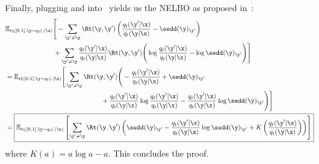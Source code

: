 \documentclass{article} %
\begin{document}
{\begin{appendices}
Finally, plugging  and  into~ yields us the NELBO as proposed in~\citet{lou2023discrete}:
\begin{align}\label{eqn:sedd_elbo}
    & \mathbb{E}_{t \in [0, 1], \y \sim q_t(. | \x)} \Bigg[- \sum_{\y' \neq \y}\Rt(\y, \y') \left( \frac{q_t(\y'|\x)}{q_t(\y | \x)}  - \sedd(\y)_{\y'} \right) \nonumber \\
    & \hspace{2.57cm} + \sum_{\y' \neq \y}  \frac{q_t(\y'|\x)}{q_t(\y | \x)}\Rt(\y, \y') \Bigg( \log \frac{q_t(\y'|\x)}{q_t(\y | \x)} - \log \sedd(\y)_{\y'} \Bigg) \Bigg] \nonumber \\
    & = \mathbb{E}_{t \in [0, 1], \y \sim q_t(. | \x)} \Bigg[\sum_{\y' \neq \y}\Rt(\y, \y') \Bigg( - \frac{q_t(\y'|\x)}{q_t(\y | \x)}  + \sedd(\y)_{\y'}  \nonumber \\
    & \hspace{5.1cm} + \frac{q_t(\y'|\x)}{q_t(\y | \x)} \log \frac{q_t(\y'|\x)}{q_t(\y | \x)} - \frac{q_t(\y'|\x)}{q_t(\y | \x)} \log \sedd(\y)_{\y'} \Bigg)\Bigg] \nonumber \\
    & = \boxed{\mathbb{E}_{t \in [0, 1], \y \sim q_t(. | \x)} \left[
    \sum_{\y' \neq \y} \Rt(\y, \y') \left(
        \sedd(\y)_{\y'}
        - \frac{q_t(\y'|\x)}{q_t(\y | \x)}\log \sedd(\y)_{\y'}
        + K\left(\frac{q_t(\y'|\x)}{q_t(\y | \x)}\right) 
        \right) \right]}
\end{align}
where $K(a) = a \log a - a$. This concludes the proof.



\end{appendices}}
\end{document}
